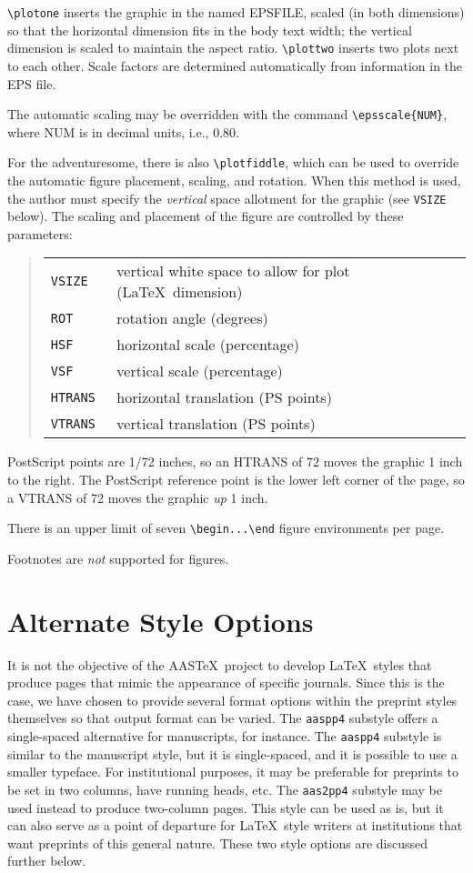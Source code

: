 \verb"\plotone" inserts the graphic in the named {\small EPSFILE},
scaled (in both dimensions) so that the horizontal
dimension fits in the body text width;
the vertical dimension is scaled to maintain the aspect ratio.
\verb"\plottwo" inserts two plots next to each other.
Scale factors are determined automatically from information in the
EPS file.

The automatic scaling may be overridden with the command 
\verb"\epsscale{NUM}", where {\small NUM}
is in decimal units, i.e., 0.80.

For the adventuresome, there is also \verb"\plotfiddle", which can be
used to override the automatic figure placement, scaling, and rotation.
When this method is used, the author must specify the {\sl vertical\/}
space allotment for the graphic (see {\tt VSIZE} below).
The scaling and placement of the figure are controlled by these parameters:
\begin{quote}
\begin{tabular}{l@{\quad}p{2in}}
\tt VSIZE & vertical white space to allow for plot (\LaTeX\ dimension)\\
\tt ROT & rotation angle (degrees)\\
\tt HSF & horizontal scale (percentage)\\
\tt VSF & vertical scale (percentage)\\
\tt HTRANS & horizontal translation (PS points)\\
\tt VTRANS & vertical translation (PS points)\\
\end{tabular}
\end{quote}
PostScript points are 1/72 inches, so an {\small HTRANS} of 72 moves
the graphic 1 inch to the right.  The PostScript reference point is
the lower left corner of the page, so a {\small VTRANS} of 72 moves
the graphic {\sl up} 1 inch.

There is an upper limit of seven \verb"\begin...\end" figure environments
per page.

Footnotes are {\sl not} supported for figures.

\section{Alternate Style Options}   \label{styles}

It is not the objective of the AAS\TeX\ project to develop \LaTeX\ styles
that produce pages that mimic the appearance of specific journals.
Since this is the case, we have chosen
to provide several format options within the preprint styles
themselves so that output format can be varied.
The {\tt aaspp4} substyle offers a single-spaced alternative for manuscripts,
for instance. 
The {\tt aaspp4} substyle is similar to the manuscript style,
but it is single-spaced, and it is possible to use a smaller typeface.
For institutional purposes, it may be preferable for preprints
to be set in two columns, have running heads, etc.
The {\tt aas2pp4} substyle may be used instead to produce
two-column pages.
This style can be used as is, but it can also serve as a point of
departure for \LaTeX\ style writers at institutions that want
preprints of this general nature.  These two style options are discussed
further below.

